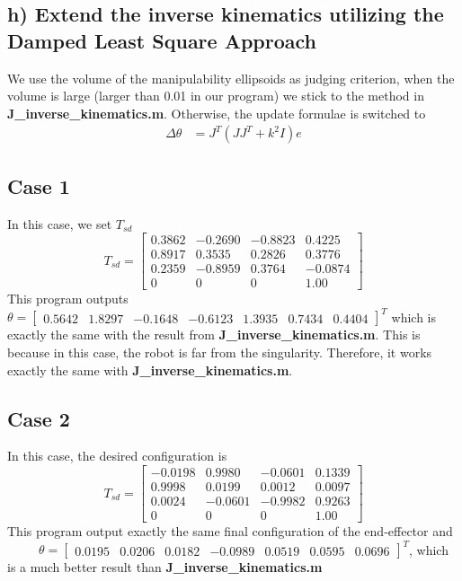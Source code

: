 \documentclass[english,10pt,a4paper]{article}
\begin{document}
    \subsection*{h) Extend the inverse kinematics utilizing the Damped Least Square Approach}
    We use the volume of the manipulability ellipsoids as judging criterion, when the volume is large (larger than 0.01 in our program) we stick to the method in \textbf{J\_inverse\_kinematics.m}. Otherwise, the update formulae is switched to
    \begin{align}
        \Delta\theta &= J ^T ( J J^T + k^2 I) e 
    \end{align}
    
    \subsection*{Case 1}
    In this case, we set $T_{sd}$
    \begin{equation}
        T_{sd} = \begin{bmatrix}
            0.3862 & -0.2690 & -0.8823 & 0.4225\\
            0.8917 & 0.3535 & 0.2826 & 0.3776\\
            0.2359 & -0.8959 & 0.3764 &  -0.0874\\
            0 & 0 & 0 & 1.00
        \end{bmatrix}
    \end{equation}
    This program outputs \(\theta = \begin{bmatrix} 0.5642 & 1.8297 & -0.1648 & -0.6123 & 1.3935 & 0.7434 & 0.4404 \end{bmatrix}^T\) which is exactly the same with the result from \textbf{J\_inverse\_kinematics.m}. This is because in this case, the robot is far from the singularity. Therefore, it works exactly the same with \textbf{J\_inverse\_kinematics.m}.

    \subsection*{Case 2}
    In this case, the desired configuration is
    \begin{equation}
        T_{sd} = \begin{bmatrix}
            -0.0198 & 0.9980 & -0.0601 & 0.1339\\
            0.9998 & 0.0199 & 0.0012 & 0.0097\\
            0.0024 & -0.0601 & -0.9982 & 0.9263\\
            0 & 0 & 0 & 1.00
        \end{bmatrix}
    \end{equation}
    This program output exactly the same final configuration of the end-effector and \ \ \ \ \ \(\theta = \begin{bmatrix} 0.0195 & 0.0206 & 0.0182 & -0.0989 & 0.0519 & 0.0595 & 0.0696 \end{bmatrix}^T\), which is a much better result than \textbf{J\_inverse\_kinematics.m}
    \printbibliography
\end{document}

